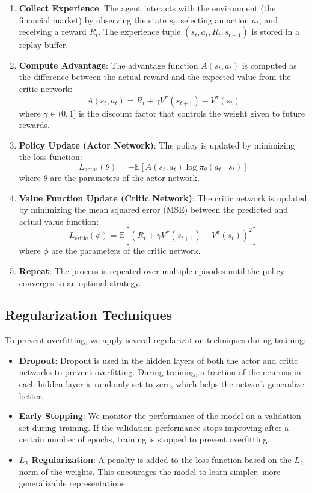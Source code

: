 \begin{enumerate}
    \item \textbf{Collect Experience}: The agent interacts with the environment (the financial market) by observing the state $s_t$, selecting an action $a_t$, and receiving a reward $R_t$. The experience tuple $(s_t, a_t, R_t, s_{t+1})$ is stored in a replay buffer.
    \item \textbf{Compute Advantage}: The advantage function $A(s_t, a_t)$ is computed as the difference between the actual reward and the expected value from the critic network:
    \[
    A(s_t, a_t) = R_t + \gamma V^\pi(s_{t+1}) - V^\pi(s_t)
    \]
    where $\gamma \in (0, 1]$ is the discount factor that controls the weight given to future rewards.
    \item \textbf{Policy Update (Actor Network)}: The policy is updated by minimizing the loss function:
    \[
    L_\text{actor}(\theta) = -\mathbb{E}\left[A(s_t, a_t) \log \pi_\theta(a_t \mid s_t)\right]
    \]
    where $\theta$ are the parameters of the actor network.
    \item \textbf{Value Function Update (Critic Network)}: The critic network is updated by minimizing the mean squared error (MSE) between the predicted and actual value function:
    \[
    L_\text{critic}(\phi) = \mathbb{E}\left[\left(R_t + \gamma V^\pi(s_{t+1}) - V^\pi(s_t)\right)^2\right]
    \]
    where $\phi$ are the parameters of the critic network.
    \item \textbf{Repeat}: The process is repeated over multiple episodes until the policy converges to an optimal strategy.
\end{enumerate}

\subsection{Regularization Techniques}

To prevent overfitting, we apply several regularization techniques during training:
\begin{itemize}
    \item \textbf{Dropout}: Dropout is used in the hidden layers of both the actor and critic networks to prevent overfitting. During training, a fraction of the neurons in each hidden layer is randomly set to zero, which helps the network generalize better.
    \item \textbf{Early Stopping}: We monitor the performance of the model on a validation set during training. If the validation performance stops improving after a certain number of epochs, training is stopped to prevent overfitting.
    \item \textbf{$L_2$ Regularization}: A penalty is added to the loss function based on the $L_2$ norm of the weights. This encourages the model to learn simpler, more generalizable representations.
\end{itemize}

